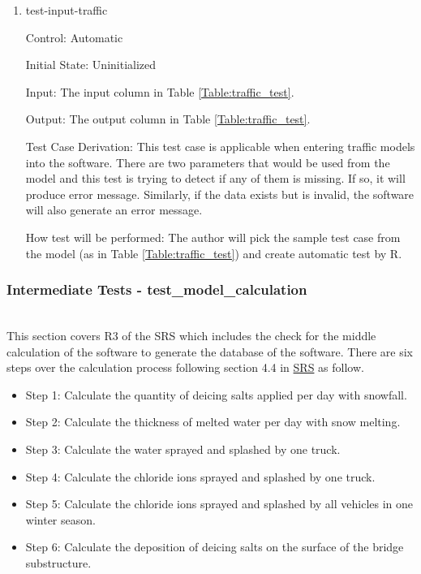 \documentclass[12pt, titlepage]{article}
\begin{document}
\begin{enumerate}
\item{test-input-traffic\\}

Control: Automatic
					
Initial State: Uninitialized

Input: The input column in Table \ref{Table:traffic_test}.
					
Output: The output column in Table \ref{Table:traffic_test}. 

Test Case Derivation: This test case is applicable when entering traffic models into the software. There are two parameters that would be used from the model and this test is trying to detect if any of them is missing. If so, it will produce error message. Similarly, if the data exists but is invalid, the software will also generate an error message.
					
How test will be performed: The author will pick the sample test case from the model (as in Table \ref{Table:traffic_test}) and create automatic test by R.
\end{enumerate}



\subsubsection{Intermediate Tests - test\_model\_calculation}\label{t_calculation}
\\
This section covers R3 of the SRS which includes the check for the middle calculation of the software to generate the database of the software. There are six steps over the calculation process following section 4.4 in \href{https://github.com/CynthiaLiu0805/BridgeCorrosion/blob/main/docs/SRS/SRS.pdf}{SRS} as follow. 
\begin{itemize}
\item Step 1: Calculate the quantity of deicing salts applied per day with snowfall.
\item Step 2: Calculate the thickness of melted water per day with snow melting.
\item Step 3: Calculate the water sprayed and splashed by one truck.
\item Step 4: Calculate the chloride ions sprayed and splashed by one truck.
\item Step 5: Calculate the chloride ions sprayed and splashed by all vehicles in one winter season.
\item Step 6: Calculate the deposition of deicing salts on the surface of the bridge substructure.
\end{itemize}
\end{document}
